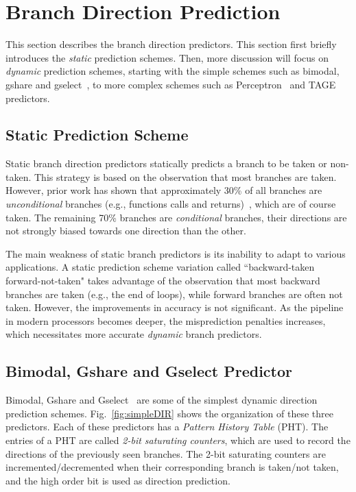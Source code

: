 \section{Branch Direction Prediction}
\label{sec:background:dirpred}
This section describes the branch direction predictors. This section first briefly introduces the \textit{static} prediction schemes. Then, more discussion will focus on \textit{dynamic} prediction schemes, starting with the simple schemes such as bimodal, gshare and gselect~\cite{McFarling}, to more complex schemes such as Perceptron~\cite{perceptron} and TAGE~\cite{tage} predictors.

\subsection{Static Prediction Scheme}
\label{sec:background:dirpred:static}
Static branch direction predictors statically predicts a branch to be taken or non-taken. This strategy is based on the observation that most branches are taken. However, prior work has shown that approximately 30\% of all branches are \textit{unconditional} branches (e.g., functions calls and returns)~\cite{histogram}, which are of course taken. The remaining 70\% branches are \textit{conditional} branches, their directions are not strongly biased towards one direction than the other.

The main weakness of static branch predictors is its inability to adapt to various applications. A static prediction scheme variation called ``backward-taken forward-not-taken" takes advantage of the observation that most backward branches are taken (e.g., the end of loops), while forward branches are often not taken. However, the improvements in accuracy is not significant. As the pipeline in modern processors becomes deeper, the misprediction penalties increases, which necessitates more accurate \textit{dynamic} branch predictors.

\subsection{Bimodal, Gshare and Gselect Predictor}
\label{sec:background:dirpred:bimodal}
Bimodal, Gshare and Gselect~\cite{McFarling} are some of the simplest dynamic direction prediction schemes. Fig.~\ref{fig:simpleDIR} shows the organization of these three predictors. Each of these predictors has a \textit{Pattern History Table} (PHT). The entries of a PHT are called \textit{2-bit saturating counters}, which are used to record the directions of the previously seen branches. The 2-bit saturating counters are incremented/decremented when their corresponding branch is taken/not taken, and the high order bit is used as direction prediction.

